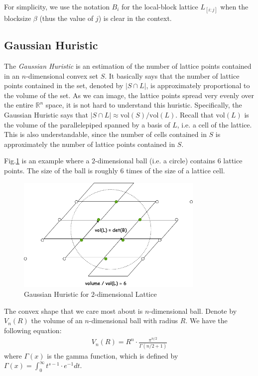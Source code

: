 \documentclass[11pt]{article}
\newcommand{\bbR}{\mathbb{R}}
\newcommand{\vol}{\mathrm{vol}}
\begin{document}
For simplicity, we use the notation $B_i$ for the local-block lattice $L_{[i:j]}$ when the blocksize $\beta$ (thus the value of $j$) is clear in the context.

\subsection{Gaussian Huristic}

The \emph{Gaussian Huristic} is an estimation of the number of lattice points contained in an $n$-dimensional convex set $S$.
It basically says that the number of lattice points contained in the set, denoted by $|S\cap L|$, is approximately proportional to the volume of the set.
As we can image, the lattice points spread very evenly over the entire $\bbR^n$ space, it is not hard to understand this huristic.
Specifically, the Gaussian Huristic says that $|S\cap L|\approx\vol(S)/\vol(L)$.
Recall that $\vol(L)$ is the volume of the parallelepiped spanned by a basis of $L$, i.e. a cell of the lattice.
This is also understandable, since the number of cells contained in $S$ is approximately the number of lattice points contained in $S$.

Fig.\ref{fig:gh} is an example where a $2$-dimensional ball (i.e. a circle) contains $6$ lattice points.
The size of the ball is roughly $6$ times of the size of a lattice cell.

\begin{figure}[ht!]
\includegraphics[width=0.8\textwidth]{files/BKZ-Gaussian-Huristic.png}
\caption{Gaussian Huristic for $2$-dimensional Lattice}
\label{fig:gh}
\end{figure}

The convex shape that we care most about is $n$-dimensional ball.
Denote by $V_n(R)$ the volume of an $n$-dimensional ball with radius $R$.
We have the following equation:
\begin{eqnarray}
V_n(R) = R^n\cdot\frac{\pi^{n/2}}{\Gamma(n/2+1)}
\end{eqnarray}
where $\Gamma(x)$ is the gamma function, which is defined by $\Gamma(x)=\int_0^{\infty}t^{s-1}\cdot e^{-1}dt$.
\end{document}
